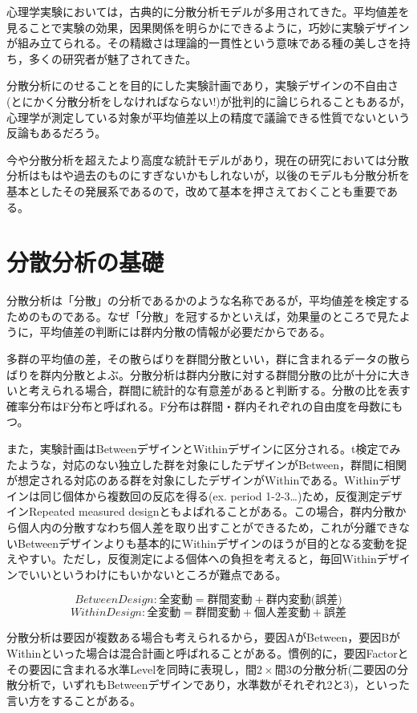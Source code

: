 \documentclass[
  a4paper,
]{ltjsbook}
\begin{document}
心理学実験においては，古典的に分散分析モデルが多用されてきた。平均値差を見ることで実験の効果，因果関係を明らかにできるように，巧妙に実験デザインが組み立てられる。その精緻さは理論的一貫性という意味である種の美しさを持ち，多くの研究者が魅了されてきた。

分散分析にのせることを目的にした実験計画であり，実験デザインの不自由さ(とにかく分散分析をしなければならない!)が批判的に論じられることもあるが，心理学が測定している対象が平均値差以上の精度で議論できる性質でないという反論もあるだろう。

今や分散分析を超えたより高度な統計モデルがあり，現在の研究においては分散分析はもはや過去のものにすぎないかもしれないが，以後のモデルも分散分析を基本としたその発展系であるので，改めて基本を押さえておくことも重要である。

\section{分散分析の基礎}\label{ux5206ux6563ux5206ux6790ux306eux57faux790e}

分散分析は「分散」の分析であるかのような名称であるが，平均値差を検定するためのものである。なぜ「分散」を冠するかといえば，効果量のところで見たように，平均値差の判断には群内分散の情報が必要だからである。

多群の平均値の差，その散らばりを群間分散といい，群に含まれるデータの散らばりを群内分散とよぶ。分散分析は群内分散に対する群間分散の比が十分に大きいと考えられる場合，群間に統計的な有意差があると判断する。分散の比を表す確率分布はF分布と呼ばれる。F分布は群間・群内それぞれの自由度を母数にもつ。

また，実験計画はBetweenデザインとWithinデザインに区分される。t検定でみたような，対応のない独立した群を対象にしたデザインがBetween，群間に相関が想定される対応のある群を対象にしたデザインがWithinである。Withinデザインは同じ個体から複数回の反応を得る(ex.
period 1-2-3\ldots)ため，反復測定デザインRepeated measured
designともよばれることがある。この場合，群内分散から個人内の分散すなわち個人差を取り出すことができるため，これが分離できないBetweenデザインよりも基本的にWithinデザインのほうが目的となる変動を捉えやすい。ただし，反復測定による個体への負担を考えると，毎回Withinデザインでいいというわけにもいかないところが難点である。

\[Between Design: \text{全変動} = \text{群間変動}+ \text{群内変動(誤差)}\]
\[Within Design:  \text{全変動} = \text{群間変動}+ \text{個人差変動} + \text{誤差}\]

分散分析は要因が複数ある場合も考えられるから，要因AがBetween，要因BがWithinといった場合は混合計画と呼ばれることがある。慣例的に，要因Factorとその要因に含まれる水準Levelを同時に表現し，\(\text{間}2 \times \text{間}3\)の分散分析(二要因の分散分析で，いずれもBetweenデザインであり，水準数がそれぞれ2と3)，といった言い方をすることがある。
\end{document}
